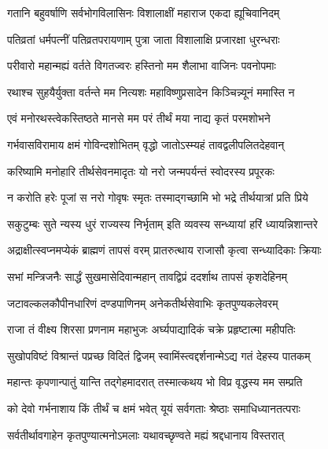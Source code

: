 \twolineshloka
{गतानि बहुवर्षाणि सर्वभोगविलासिनः}
{विशालाक्षीं महाराज एकदा ह्यूचिवानिदम्}%

\twolineshloka
{पतिव्रतां धर्मपत्नीं पतिव्रतपरायणाम्}
{पुत्रा जाता विशालाक्षि प्रजारक्षा धुरन्धराः}%

\twolineshloka
{परीवारो महान्मह्यं वर्तते विगतज्वरः}
{हस्तिनो मम शैलाभा वाजिनः पवनोपमाः}%

\twolineshloka
{रथाश्च सुहयैर्युक्ता वर्तन्ते मम नित्यशः}
{महाविष्णुप्रसादेन किञ्चिन्न्यूनं ममास्ति न}%

\twolineshloka
{एवं मनोरथस्त्वेकस्तिष्ठते मानसे मम}
{परं तीर्थं मया नाद्य कृतं परमशोभने}%

\twolineshloka
{गर्भवासविरामाय क्षमं गोविन्दशोभितम्}
{वृद्धो जातोऽस्म्यहं तावद्वलीपलितदेहवान्}%

\twolineshloka
{करिष्यामि मनोहारि तीर्थसेवनमादृतः}
{यो नरो जन्मपर्यन्तं स्वोदरस्य प्रपूरकः}%

\twolineshloka
{न करोति हरेः पूजां स नरो गोवृषः स्मृतः}
{तस्माद्गच्छामि भो भद्रे तीर्थयात्रां प्रति प्रिये}%

\twolineshloka
{सकुटुम्बः सुते न्यस्य धुरं राज्यस्य निर्भृताम्}
{इति व्यवस्य सन्ध्यायां हरिं ध्यायन्निशान्तरे}%

\twolineshloka
{अद्राक्षीत्स्वप्नमप्येकं ब्राह्मणं तापसं वरम्}
{प्रातरुत्थाय राजासौ कृत्वा सन्ध्यादिकाः क्रियाः}%

\twolineshloka
{सभां मन्त्रिजनैः सार्द्धं सुखमासेदिवान्महान्}
{तावद्विप्रं ददर्शाथ तापसं कृशदेहिनम्}%

\twolineshloka
{जटावल्कलकौपीनधारिणं दण्डपाणिनम्}
{अनेकतीर्थसेवाभिः कृतपुण्यकलेवरम्}%

\twolineshloka
{राजा तं वीक्ष्य शिरसा प्रणनाम महाभुजः}
{अर्घ्यपाद्यादिकं चक्रे प्रहृष्टात्मा महीपतिः}%

\twolineshloka
{सुखोपविष्टं विश्रान्तं पप्रच्छ विदितं द्विजम्}
{स्वामिंस्त्वद्दर्शनान्मेऽद्य गतं देहस्य पातकम्}%

\twolineshloka
{महान्तः कृपणान्पातुं यान्ति तद्गेहमादरात्}
{तस्मात्कथय भो विप्र वृद्धस्य मम सम्प्रति}%

\twolineshloka
{को देवो गर्भनाशाय किं तीर्थं च क्षमं भवेत्}
{यूयं सर्वगताः श्रेष्ठाः समाधिध्यानतत्पराः}%

\twolineshloka
{सर्वतीर्थावगाहेन कृतपुण्यात्मनोऽमलाः}
{यथावच्छृण्वते मह्यं श्रद्दधानाय विस्तरात्}%



